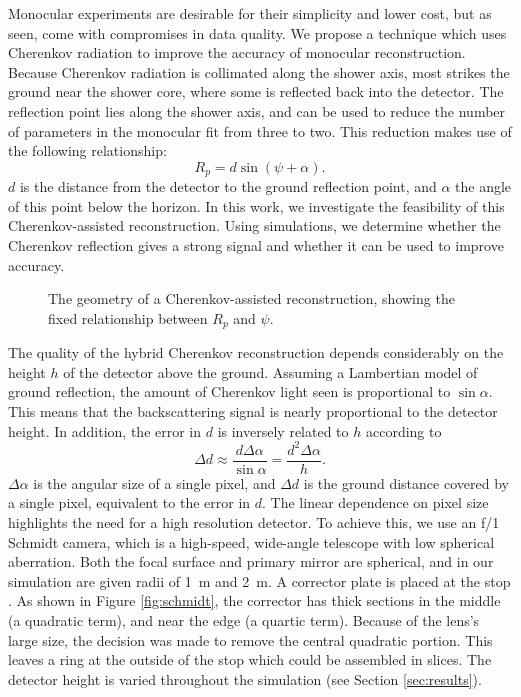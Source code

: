 Monocular experiments are desirable for their simplicity and lower cost, but as seen, come with compromises in data quality. We propose a technique which uses Cherenkov radiation to improve the accuracy of monocular reconstruction. Because Cherenkov radiation is collimated along the shower axis, most strikes the ground near the shower core, where some is reflected back into the detector. The reflection point lies along the shower axis, and can be used to reduce the number of parameters in the monocular fit from three to two. This reduction makes use of the following relationship:
\begin{equation} \label{eq:ckv_relation}
    R_p = d \sin(\psi + \alpha).
\end{equation}
$d$ is the distance from the detector to the ground reflection point, and $\alpha$ the angle of this point below the horizon. In this work, we investigate the feasibility of this Cherenkov-assisted reconstruction. Using simulations, we determine whether the Cherenkov reflection gives a strong signal and whether it can be used to improve accuracy.

\begin{figure}[!ht]
    \label{fig:hybridrecon}
    \centering
    \caption{The geometry of a Cherenkov-assisted reconstruction, showing the fixed relationship between $R_p$ and $\psi$.}
\end{figure}

The quality of the hybrid Cherenkov reconstruction depends considerably on the height $h$ of the detector above the ground. Assuming a Lambertian model of ground reflection, the amount of Cherenkov light seen is proportional to $\sin{\alpha}$. This means that the backscattering signal is nearly proportional to the detector height. In addition, the error in $d$ is inversely related to $h$ according to
\begin{equation} \label{eq:ground_err}
    \Delta d \approx \frac{d \Delta \alpha}{\sin{\alpha}} = \frac{d^2 \Delta \alpha}{h}.
\end{equation}
$\Delta \alpha$ is the angular size of a single pixel, and $\Delta d$ is the ground distance covered by a single pixel, equivalent to the error in $d$. The linear dependence on pixel size highlights the need for a high resolution detector. To achieve this, we use an f/1 Schmidt camera, which is a high-speed, wide-angle telescope with low spherical aberration. Both the focal surface and primary mirror are spherical, and in our simulation are given radii of \SI{1}{m} and \SI{2}{m}. A corrector plate is placed at the stop \cite{malacara2004optics}. As shown in Figure \ref{fig:schmidt}, the corrector has thick sections in the middle (a quadratic term), and near the edge (a quartic term). Because of the lens's large size, the decision was made to remove the central quadratic portion. This leaves a ring at the outside of the stop which could be assembled in slices. The detector height is varied throughout the simulation (see Section \ref{sec:results}).

